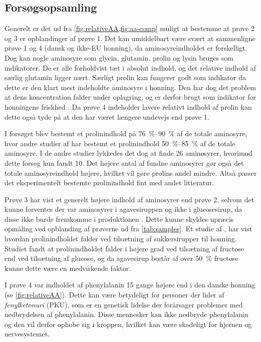 \subsection{Forsøgsopsamling}
Generelt er det ud fra \cref{fig:relativeAA,fig:aa-comp} muligt at bestemme at prøve 2 og 3 er opblandinger af prøve 1.
Det kan umiddelbart være svært at sammenligne prøve 1 og 4 (dansk og ikke-EU honning), da aminosyreindholdet er forskelligt.
Dog kan nogle aminosyre som glycin, glutamin, prolin og lysin bruges som indikatorer.
De er alle forholdvist tæt i absolut indhold, og det relative indhold af særlig glutamin ligger nært.
Særligt prolin kan fungerer godt som indikator da dette er den klart mest indeholdte aminosyre i honning.
Den har dog det problem at dens koncentration falder under oplagring, og er derfor brugt som indikator for honningens friskhed \parencite{VonDerOhe}.
Da prøve 4 indeholder lavere relativt indhold af prolin kan dette også tyde på at den har været længere undevejs end prøve 1.
\par I forsøget blev bestemt et prolinindhold på \qtyrange{76}{90}{\percent} af de totale aminosyre, hvor andre studier af \cite{geohoney,aaPureHoney} har bestemt et prolinindhold \qtyrange{50}{85}{\percent} af de totale aminosyre.
I de andre studier lykkedes det dog at finde \num{26} aminosyrer, hvorimod dette forsøg kun fandt \num{10}. Det højere antal af fundne aminosyrer gør også det totale aminosyreindhold højere, hvilket vil gøre prolins andel mindre.
Altså passer det eksperimentelt bestemte prolinindhold fint med andet litteratur.
\par Prøve 3 har vist et generelt højere indhold af aminosyrer end prøve 2, selvom det kunne forventes der var aminosyrer i agavesiruppen \parencite{agaveAA} og ikke i glucosesirup, da disse ikke burde fremkomme i produktionen \parencite{glucoseManufacture}.
Dette kunne skyldes upræcis opmåling ved opblanding af prøverne ud fra \cref{tab:samples}.
Et studie af \cite{prolineHoney}, har vist hvordan prolinindholdet falder ved tilsætning af sukkersirupper til honning.
Studiet fandt at prolinindholdet falder i højere grad ved tilsætning af fructose end ved tilsætning af glucose, og da agavesirup består af over \qty{50}{\percent} fructose \parencite{agaveSyrup} kunne dette være en medvirkende faktor.
\par I prøve 4 var indholdet af phenylalanin \num{15} gange højere end i den danske honning (se \cref{fig:relativeAA}).
Dette kan være betydeligt for personer der lider af \emph{fenylketonuri} (PKU), som er en genetisk lidelse der forårsager problemer med nedbrydelsen af phenylalanin.
Disse mennesker kan ikke nedbryde phenylalanin og den vil derfor ophobe sig i kroppen, hvilket kan være skadeligt for hjernen og nervesystemet. \parencite{PKU}
